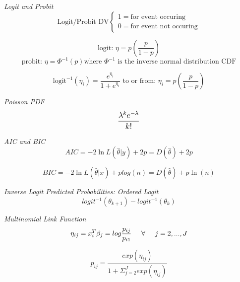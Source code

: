 \documentclass[12pt]{article}
\begin{document}
\textit{Logit and Probit}
\begin{equation}\nonumber
\text{Logit/Probit DV} 
\begin{cases}
  1 = \text{for event occuring}    \\
  0 = \text{for event not occuring} 
\end{cases}
\end{equation}

\begin{equation}
\text{logit:  } \eta =  p\left( \frac{p}{1-p}\right)  
\end{equation}
\begin{equation}
\text{probit:  } \eta = \Phi^{-1}(p) \text{where }  \Phi^{-1} \text{ is the inverse normal distribution CDF}
\end{equation}

\begin{equation}
\text{logit}^{-1} (\eta_i) = \frac{e^{\eta_i}}{1+e^{\eta_i}} \text{ to or from: } \eta_i = p\left( \frac{p}{1-p}\right) 
\end{equation}

\textit{Poisson PDF}
\begin{equation}
\mathlarger{ \frac{\lambda^k e^{-\lambda}}{k!} }
\end{equation}

\textit{AIC and BIC}
\begin{equation}
AIC = -2 \ln L(\hat{\theta} \vert y) + 2p = D(\hat{\theta} ) +2p 
\end{equation}

\begin{equation}
BIC = -2 \ln L(\hat{\theta} \vert x) +plog(n) = D(\hat{\theta}) + p \ln (n)
\end{equation}

\textit{Inverse Logit Predicted Probabilities: Ordered Logit}
\begin{equation}
logit^{-1} (\theta_{k+1}) - logit^{-1}(\theta_k)
\end{equation}

\textit{Multinomial Link Function}
\begin{equation}
\eta_{ij} = x^{T}_i \beta_j = log \frac{p_{ij}}{p_{i1}} \hspace{.5cm} \forall  \hspace{.5cm}  j = 2, ... , J    
\end{equation}

\begin{equation}
 p_{ij} = \frac{exp(\eta_{ij})}{1+ \Sigma^{J}_{j=2} exp (\eta_{ij}) }     
\end{equation}
\end{document}

